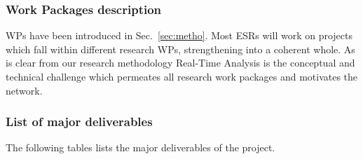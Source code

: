 %

\subsubsection{Work Packages description}\label{sec:WPdescription}

\acronym WPs have been introduced in Sec.~\ref{sec:metho}. 
Most ESRs will work on projects which fall within different research WPs, strengthening
\acronym into a coherent whole.
As is clear from our research methodology %
Real-Time Analysis is the conceptual and technical challenge which permeates all research work packages 
and motivates the network.
\vspace{-5mm}

%
%
%
%
%
%
%

\FloatBarrier

\subsubsection{List of major deliverables}

\vspace{-1mm}
The following tables lists the major deliverables of the project. 

